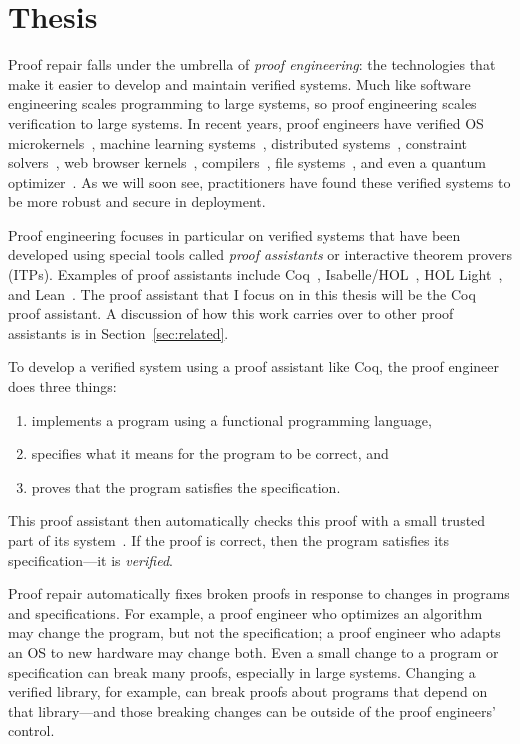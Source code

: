 \section{Thesis}

Proof repair falls under the umbrella of \textit{proof engineering}: the technologies that make it easier
to develop and maintain verified systems.
Much like software engineering scales programming to large systems, so proof engineering scales verification to large systems. 
In recent years, proof engineers have verified OS microkernels~\cite{Klein2009, Klein2014micro}, machine learning systems~\cite{TODO}, distributed systems~\cite{TODO}, constraint solvers~\cite{TODO}, web browser kernels~\cite{TODO}, compilers~\cite{Leroy:POPL06, Leroy2009}, file systems~\cite{TODO}, and even a quantum optimizer~\cite{TODO}.
As we will soon see, practitioners have found these verified systems to be more robust and secure in deployment. %

Proof engineering focuses in particular on verified systems that have been
developed using special tools called \textit{proof assistants} or interactive theorem provers (ITPs).
Examples of proof assistants include Coq~\cite{coq}, Isabelle/HOL~\cite{isabelle}, 
HOL Light~\cite{hollight}, and Lean~\cite{lean}.
The proof assistant that I focus on in this thesis will be the Coq proof assistant.
A discussion of how this work carries over to other proof assistants is in Section~\ref{sec:related}.

To develop a verified system using a proof assistant like Coq, the proof engineer does three things:

\begin{enumerate}
\item implements a program using a functional programming language,
\item specifies what it means for the program to be correct, and
\item proves that the program satisfies the specification.
\end{enumerate}
This proof assistant then automatically checks this proof with a small trusted part of its system~\cite{Barendregt2002,Barendregt2351}.
If the proof is correct, then the program satisfies its specification---it is \textit{verified}.

Proof repair automatically fixes broken proofs in response to changes in programs and specifications.
For example, a proof engineer who optimizes an algorithm may change the program, but not the specification; a proof engineer who adapts an OS to new hardware may change both. Even a small change to a program or specification can break many proofs, especially in large systems.
Changing a verified library, for example, can break proofs about programs that depend on that library---and those breaking changes
can be outside of the proof engineers' control.

